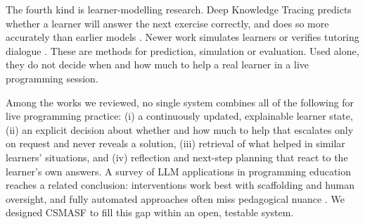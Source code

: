 The fourth kind is learner-modelling research. Deep Knowledge Tracing predicts whether a learner will answer the next exercise correctly, and does so more accurately than earlier models \cite{piech2015}. Newer work simulates learners or verifies tutoring dialogue \cite{zhan2025,wang2025}. These are methods for prediction, simulation or evaluation. Used alone, they do not decide when and how much to help a real learner in a live programming session.

Among the works we reviewed, no single system combines all of the following for live programming practice: (i) a continuously updated, explainable learner state, (ii) an explicit decision about whether and how much to help that escalates only on request and never reveals a solution, (iii) retrieval of what helped in similar learners' situations, and (iv) reflection and next-step planning that react to the learner's own answers. A survey of LLM applications in programming education reaches a related conclusion: interventions work best with scaffolding and human oversight, and fully automated approaches often miss pedagogical nuance \cite{pitts2025}. We designed CSMASF to fill this gap within an open, testable system.

